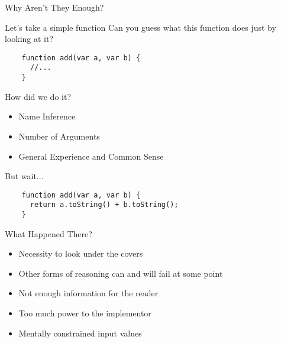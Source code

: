 \begin{section}{Why Aren't They Enough?}

\begin{frame}[fragile]{Let's take a simple function}
  Can you guess what this function does just by looking at it?
  \begin{verbatim}
    function add(var a, var b) {
      //...
    }
  \end{verbatim}
\end{frame}

\begin{frame}{How did we do it?}
  \begin{center}
    \begin{itemize}
    \item Name Inference
    \item Number of Arguments
    \item General Experience and Common Sense
    \end{itemize}
\end{center}
\end{frame}

\begin{frame}[fragile]{But wait...}
  \begin{verbatim}
    function add(var a, var b) {
      return a.toString() + b.toString();
    }
  \end{verbatim}
\end{frame}

\begin{frame}{What Happened There?}
  \begin{itemize}
    \item Necessity to look under the covers
    \item Other forms of reasoning can and will fail at some point
    \item Not enough information for the reader
    \item Too much power to the implementor
    \item Mentally constrained input values
  \end{itemize}
\end{frame}

\end{section}
